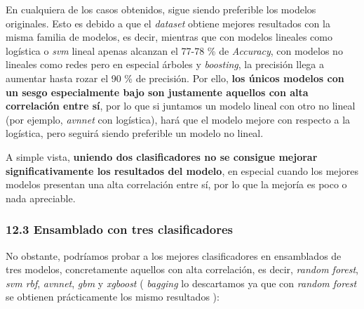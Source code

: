 \documentclass[
]{article}
\begin{document}
En cualquiera de los casos obtenidos, sigue siendo preferible los
modelos originales. Esto es debido a que el \emph{dataset} obtiene
mejores resultados con la misma familia de modelos, es decir, mientras
que con modelos lineales como logística o \emph{svm} lineal apenas
alcanzan el 77-78 \% de \emph{Accuracy}, con modelos no lineales como
redes pero en especial árboles y \emph{boosting}, la precisión llega a
aumentar hasta rozar el 90 \% de precisión. Por ello, \textbf{los únicos
modelos con un sesgo especialmente bajo son justamente aquellos con alta
correlación entre sí}, por lo que si juntamos un modelo lineal con otro
no lineal (por ejemplo, \emph{avnnet} con logística), hará que el modelo
mejore con respecto a la logística, pero seguirá siendo preferible un
modelo no lineal.

A simple vista, \textbf{uniendo dos clasificadores no se consigue
mejorar significativamente los resultados del modelo}, en especial
cuando los mejores modelos presentan una alta correlación entre sí, por
lo que la mejoría es poco o nada apreciable.

\hypertarget{ensamblado-con-tres-clasificadores}{%
\subsubsection{12.3 Ensamblado con tres
clasificadores}\label{ensamblado-con-tres-clasificadores}}

No obstante, podríamos probar a los mejores clasificadores en
ensamblados de tres modelos, concretamente aquellos con alta
correlación, es decir, \emph{random forest}, \emph{svm rbf},
\emph{avnnet}, \emph{gbm} y \emph{xgboost} ( \emph{bagging} lo
descartamos ya que con \emph{random forest} se obtienen prácticamente
los mismo resultados ):
\end{document}
